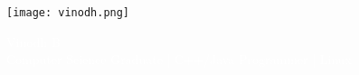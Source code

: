 \documentclass[11pt,a4paper]{article}
\begin{document}
\begin{tcolorbox}
	\begin{minipage}{4.5cm}
		\hspace*{-0.3em}\texttt{[image: vinodh.png]}
	\end{minipage}
	\begin{minipage}{15cm}
		\begin{center}
			\hspace*{-5em}\Huge{\textcolor{white}{Vinodh B}} \\
			\vspace*{0.5cm}
			\Large{\textcolor{white}{Computer Science Graduate | C++/Java Programmer | Linux}}
		\end{center}
	\end{minipage}
\end{tcolorbox}
\end{document}
